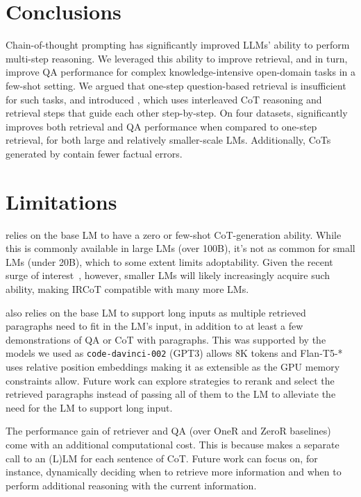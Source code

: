 \section{Conclusions}

Chain-of-thought prompting has significantly improved LLMs' ability to perform multi-step reasoning. We leveraged this ability to improve retrieval, and in turn, improve QA performance for complex knowledge-intensive open-domain tasks in a few-shot setting. We argued that one-step question-based retrieval is insufficient for such tasks, and introduced \iconsys, which uses interleaved CoT reasoning and retrieval steps that guide each other step-by-step. On four datasets, \iconsys significantly improves both retrieval and QA performance when compared to one-step retrieval, for both large and relatively smaller-scale LMs. Additionally, CoTs generated by \iconsys contain fewer factual errors.
\section*{Limitations}
\label{sec:limitations}

\iconsys relies on the base LM to have a zero or few-shot CoT-generation ability.  While this is commonly available in large LMs (over 100B), it's not as common for small LMs (under 20B), which to some extent limits \iconsys adoptability. Given the recent surge of interest~\cite{ul2,reasoningdistillation1,reasoningdistillation2}, however, smaller LMs will likely increasingly acquire such ability, making IRCoT compatible with many more LMs.

\iconsys also relies on the base LM to support long inputs as multiple retrieved paragraphs need to fit in the LM's input, in addition to at least a few demonstrations of QA or CoT with paragraphs. This was supported by the models we used as \texttt{code-davinci-002} (GPT3) allows 8K tokens and Flan-T5-* uses relative position embeddings making it as extensible as the GPU memory constraints allow. Future work can explore strategies to rerank and select the retrieved paragraphs instead of passing all of them to the LM to alleviate the need for the LM to support long input.

The performance gain of \iconsys retriever and QA (over OneR and ZeroR baselines) come with an additional computational cost. This is because \iconsys makes a separate call to an (L)LM for each sentence of CoT. Future work can focus on, for instance, dynamically deciding when to retrieve more information and when to perform additional reasoning with the current information.


